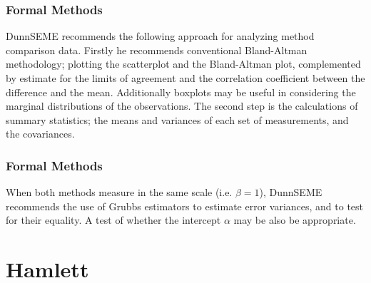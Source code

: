 \documentclass[compress]{beamer}        %
\begin{document}
\begin{frame}
\frametitle{Formal Methods}
\alert{DunnSEME} recommends the following approach for analyzing
method comparison data. Firstly he recommends conventional
Bland-Altman methodology; plotting the scatterplot and the
Bland-Altman plot, complemented by estimate for the limits of
agreement and the correlation coefficient between the difference
and the mean. Additionally boxplots may be useful in considering
the marginal distributions of the observations. The second step is
the calculations of summary statistics; the means and variances of
each set of measurements, and the covariances.
\end{frame}
\begin{frame}
\frametitle{Formal Methods}
When both methods measure in the same scale (i.e. $\beta = 1$),
\alert{DunnSEME} recommends the use of Grubbs estimators to
estimate error variances, and to test for their equality. A test
of whether the intercept $\alpha$ may be also be appropriate.





\end{frame}
\section{Hamlett}
\end{document}

